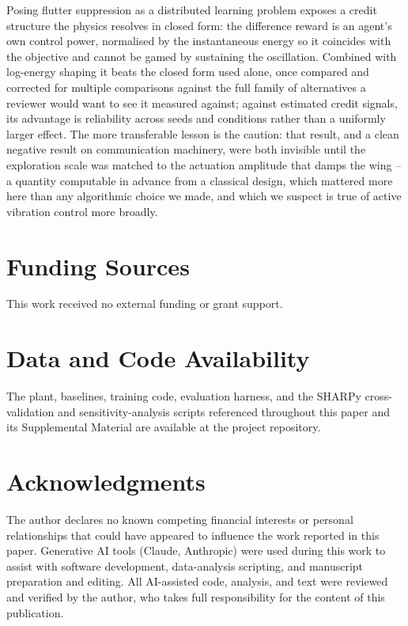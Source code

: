 \documentclass[preprint,11pt]{elsarticle}
\begin{document}
Posing flutter suppression as a distributed learning problem exposes a
credit structure the physics resolves in closed form: the difference
reward is an agent's own control power, normalised by the instantaneous
energy so it coincides with the objective and cannot be gamed by
sustaining the oscillation. Combined with log-energy shaping it beats the
closed form used alone, once compared and corrected for multiple
comparisons against the full family of alternatives a reviewer would want
to see it measured against; against estimated credit signals, its
advantage is reliability across seeds and conditions rather than a
uniformly larger effect. The more transferable lesson is the caution: that
result, and a clean negative result on communication machinery, were both
invisible until the exploration scale was matched to the actuation
amplitude that damps the wing -- a quantity computable in advance from a
classical design, which mattered more here than any algorithmic choice we
made, and which we suspect is true of active vibration control more
broadly.

\section*{Funding Sources}
This work received no external funding or grant support.

\section*{Data and Code Availability}
The plant, baselines, training code, evaluation harness, and the SHARPy
cross-validation and sensitivity-analysis scripts referenced throughout
this paper and its Supplemental Material are available at the project
repository.

\section*{Acknowledgments}
The author declares no known competing financial interests or personal
relationships that could have appeared to influence the work reported in
this paper. Generative AI tools (Claude, Anthropic) were used during this
work to assist with software development, data-analysis scripting, and
manuscript preparation and editing. All AI-assisted code, analysis, and
text were reviewed and verified by the author, who takes full
responsibility for the content of this publication.



\end{document}
